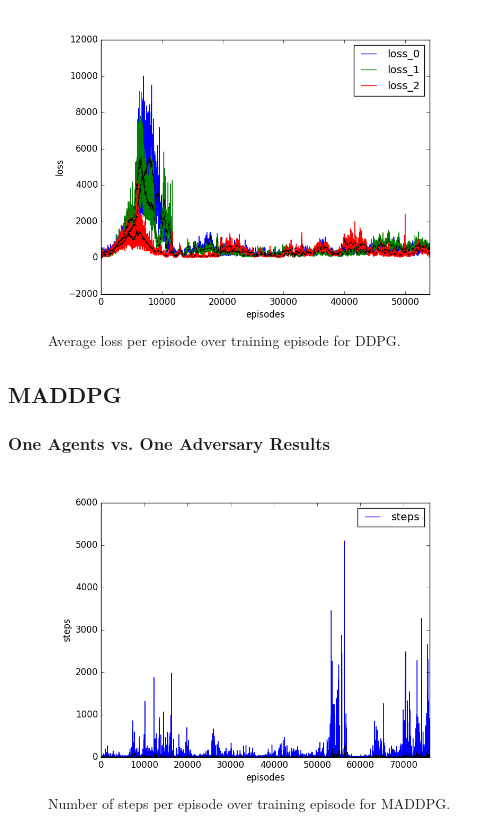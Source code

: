 \begin{figure}[h]
  \centering
  \includegraphics[trim=10 10 10 10,clip,width=\figscale\linewidth]
  {../results/ddpg_2vs1/loss.png}
  \caption{Average loss per episode over training episode for DDPG.}
  \label{fig:ddpg-2vs1}
\end{figure}
\FloatBarrier


\subsection{MADDPG}
\label{sec:experiment:maddpg}


\subsubsection{One Agents vs. One Adversary Results}
\label{sec:experiment:maddpg:1vs1}


\begin{figure}[h]
  \centering
  \includegraphics[trim=10 10 10 10,clip,width=\figscale\linewidth]
  {../results/maddpg_1vs1/steps.png}
  \caption{Number of steps per episode over training episode for MADDPG.}
  \label{fig:maddpg-1vs1}
\end{figure}
\FloatBarrier


